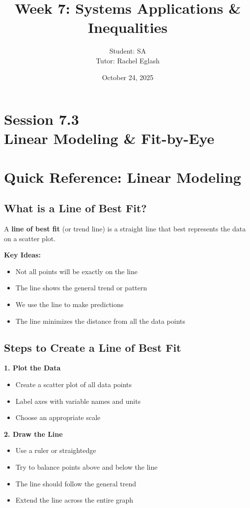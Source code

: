 \documentclass[12pt]{article}
\title{Week 7: Systems Applications \& Inequalities}
\author{
	Student: SA\\
	Tutor: Rachel Eglash}
\date{October 24, 2025}
\begin{document}
	
	\maketitle

	\section*{Session 7.3 \\ Linear Modeling \& Fit-by-Eye}

		\newpage

	\section*{Quick Reference: Linear Modeling}

		\subsection*{What is a Line of Best Fit?}

			A \textbf{line of best fit} (or trend line) is a straight line that best represents the data on a scatter plot.

			\textbf{Key Ideas:}
			\begin{itemize}
				\item Not all points will be exactly on the line
				\item The line shows the general trend or pattern
				\item We use the line to make predictions
				\item The line minimizes the distance from all the data points
			\end{itemize}

		\subsection*{Steps to Create a Line of Best Fit}

			\textbf{1. Plot the Data}
			\begin{itemize}
				\item Create a scatter plot of all data points
				\item Label axes with variable names and units
				\item Choose an appropriate scale
			\end{itemize}

			\textbf{2. Draw the Line}
			\begin{itemize}
				\item Use a ruler or straightedge
				\item Try to balance points above and below the line
				\item The line should follow the general trend
				\item Extend the line across the entire graph
			\end{itemize}
\end{document}
